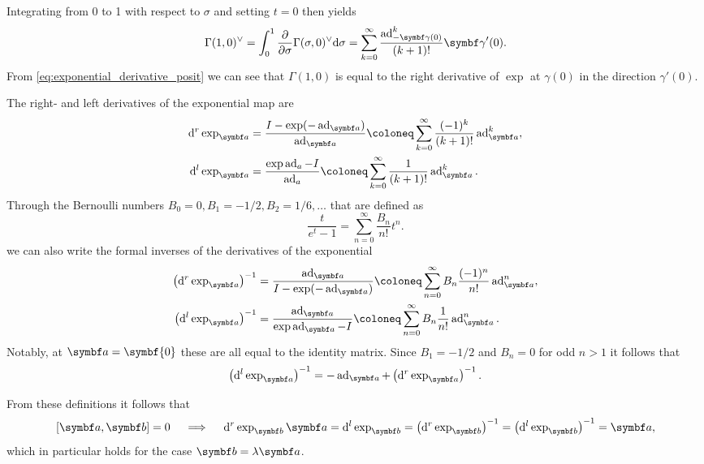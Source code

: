Integrating from 0 to 1 with respect to $\sigma$ and setting $t = 0$ then yields
\begin{equation}
  \Gamma(1, 0)^\vee = \int_0^1 \frac{\partial}{\partial \sigma} \Gamma(\sigma, 0)^\vee \mathrm{d} \sigma = \sum_{k=0}^\infty \frac{\ad^k_{-\bgamma(0)}}{(k+1)!}\bgamma'(0).
\end{equation}
From \eqref{eq:exponential_derivative_posit} we can see that $\Gamma(1, 0)$ is equal to the right derivative of $\exp$ at $\gamma(0)$ in the direction $\gamma'(0)$.

\begin{properties}
  The right- and left derivatives of the exponential map are
  \begin{equation}
    \label{eq:dexp_def}
    \begin{aligned}
      \mathrm{d}^r \exp_\a & = \frac{I - \exp (-\ad_{\a})}{\ad_{\a}} \coloneq \sum_{k=0}^\infty \frac{(-1)^k }{(k+1)!} \ad^k_{\a}, \\
      \mathrm{d}^l \exp_\a & = \frac{\exp \ad_{a} - I}{\ad_{a}} \coloneq \sum_{k=0}^\infty \frac{1 }{(k+1)!} \ad^k_{\a}.
    \end{aligned}
  \end{equation}
  Through the Bernoulli numbers $B_0 = 0, B_1 = -1/2, B_2 = 1/6, \ldots$ that are defined as
  \begin{equation}
    \label{eq:bernoulli_number_def}
    \frac{t}{e^t - 1} = \sum_{n=0}^\infty \frac{B_n}{n!} t^n.
  \end{equation}
  we can also write the formal inverses of the derivatives of the exponential
  \begin{equation}
    \label{eq:dexpinv_def}
    \begin{aligned}
      \left(\mathrm{d}^r \exp_\a\right)^{-1} & = \frac{\ad_{\a}}{I - \exp (- \ad_{\a})} \coloneq \sum_{n=0}^\infty B_n \frac{(-1)^n}{n!} \ad_{\a}^n, \\
      \left(\mathrm{d}^l \exp_\a\right)^{-1} & = \frac{\ad_{\a}}{\exp \ad_{\a} - I} \coloneq \sum_{n=0}^\infty B_n \frac{1}{n!} \ad_\a^n.
    \end{aligned}
  \end{equation}
  Notably, at $\a = \symbf{0}$ these are all equal to the identity matrix. Since $B_1 = -1/2$ and $B_n = 0$ for odd $n > 1$ it follows that
  \begin{equation}
    \left(\mathrm{d}^l \exp_\a\right)^{-1} = -\ad_\a + \left(\mathrm{d}^r \exp_\a\right)^{-1}.
  \end{equation}
\end{properties}
From these definitions it follows that
\begin{equation}
  \left[ \a, \b \right] = 0 \quad \implies \quad \mathrm{d}^r \exp_{\b} \a = \mathrm{d}^l \exp_\b = \left( \mathrm{d}^r \exp_\b \right)^{-1} = \left( \mathrm{d}^l \exp_\b \right)^{-1} = \a,
\end{equation}
which in particular holds for the case $\b = \lambda \a$.

